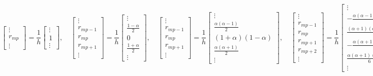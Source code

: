 \documentclass[11pt,twoside,a4paper,english]{book}
\begin{document}
\begin{equation}\label{eq:LagrangeArrays}
\begin{bmatrix}
\vdots\\
r_{mp} \\
\vdots
\end{bmatrix} = \frac{1}{h}\begin{bmatrix}
\vdots\\
1 \\
\vdots
\end{bmatrix},\quad 
\begin{bmatrix}
\vdots\\
r_{mp-1} \\
r_{mp} \\
r_{mp+1} \\
\vdots
\end{bmatrix} = \frac{1}{h}\begin{bmatrix}
\vdots\\
\frac{1-\alpha}{2} \\
0 \\
\frac{1+\alpha}{2} \\
\vdots
\end{bmatrix},\quad
\begin{bmatrix}
\vdots\\
r_{mp-1} \\
r_{mp} \\
r_{mp+1} \\
\vdots
\end{bmatrix} = \frac{1}{h}\begin{bmatrix}
\vdots\\
\frac{\alpha(\alpha-1)}{2} \\
(1+\alpha)(1-\alpha) \\
\frac{\alpha(\alpha+1)}{2} \\
\vdots
\end{bmatrix},\quad
\begin{bmatrix}
\vdots\\
r_{mp-1} \\
r_{mp} \\
r_{mp+1} \\
r_{mp+2} \\
\vdots
\end{bmatrix} = \frac{1}{h}\begin{bmatrix}
\vdots\\
-\frac{\alpha(\alpha-1)(\alpha-2)}{6} \\
\frac{(\alpha+1)(\alpha-1)(\alpha-2)}{2} \\
-\frac{\alpha(\alpha+1)(\alpha-2)}{2} \\
\frac{\alpha(\alpha+1)(\alpha-1)}{6}\\
\vdots
\end{bmatrix}
\end{equation}
\end{document}
